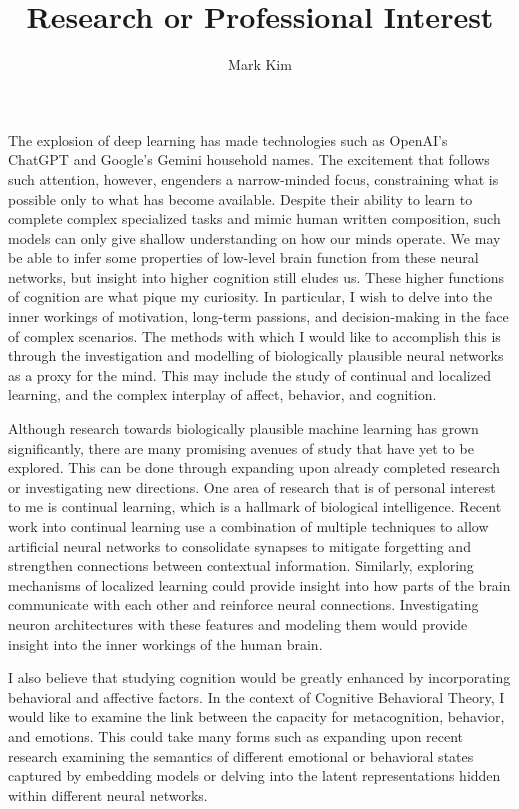\documentclass[12pt]{article}
\author{Mark Kim}
\title{Research or Professional Interest}
\begin{document}
\maketitle
The explosion of deep learning has made technologies such as OpenAI's ChatGPT and Google's Gemini household names. The excitement that
follows such attention, however, engenders a narrow-minded focus, constraining what is possible only to what has become available. Despite
their ability to learn to complete complex specialized tasks and mimic human written composition, such models can only give shallow
understanding on how our minds operate. We may be able to infer some properties of low-level brain function from these neural networks, but
insight into higher cognition still eludes us. These higher functions of cognition are what pique my curiosity. In particular, I wish to
delve into the inner workings of motivation, long-term passions, and decision-making in the face of complex scenarios. The methods with
which I would like to accomplish this is through the investigation and modelling of biologically plausible neural networks as a proxy for
the mind. This may include the study of continual and localized learning, and the complex interplay of affect, behavior, and cognition.

Although research towards biologically plausible machine learning has grown significantly, there are many promising avenues of study that
have yet to be explored. This can be done through expanding upon already completed research or investigating new directions. One area of
research that is of personal interest to me is continual learning, which is a hallmark of biological intelligence. Recent work into
continual learning use a combination of multiple techniques to allow artificial neural networks to consolidate synapses to mitigate
forgetting and strengthen connections between contextual information. Similarly, exploring mechanisms of localized learning could provide
insight into how parts of the brain communicate with each other and reinforce neural connections. Investigating neuron architectures with
these features and modeling them would provide insight into the inner workings of the human brain.

I also believe that studying cognition would be greatly enhanced by incorporating behavioral and affective factors. In the context of
Cognitive Behavioral Theory, I would like to examine the link between the capacity for metacognition, behavior, and emotions. This could
take many forms such as expanding upon recent research examining the semantics of different emotional or behavioral states captured by
embedding models or delving into the latent representations hidden within different neural networks.
\end{document}
